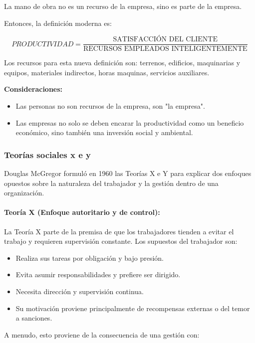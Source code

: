 \documentclass[a4paper,oneside,11pt]{article}
\begin{document}
La mano de obra no es un recurso de la empresa, sino es parte de la empresa.

Entonces, la definición moderna es:

\begin{equation}
    PRODUCTIVIDAD = \frac{\text{SATISFACCIÓN DEL CLIENTE}}{\text{RECURSOS EMPLEADOS INTELIGENTEMENTE}}
\end{equation}

Los recursos para esta nueva definición son: terrenos, edificios, maquinarias y equipos, materiales indirectos, horas maquinas, servicios auxiliares.

\textbf{Consideraciones:}
\begin{itemize}
    \item Las personas no son recursos de la empresa, son "la empresa".
    \item Las empresas no solo se deben encarar la productividad como un beneficio económico, sino también una inversión social y ambiental.
\end{itemize}

\subsubsection{Teorías sociales x e y}

Douglas McGregor formuló en 1960 las Teorías X e Y para explicar dos enfoques opuestos sobre la naturaleza del trabajador y la gestión dentro de una organización.


\paragraph{\textbf{Teoría X (Enfoque autoritario y de control):}}

La Teoría X parte de la premisa de que los trabajadores tienden a evitar el trabajo y requieren supervisión constante. Los supuestos del trabajador son:
\begin{itemize}
    \item Realiza sus tareas por obligación y bajo presión.
    \item Evita asumir responsabilidades y prefiere ser dirigido.
    \item Necesita dirección y supervisión continua.
    \item Su motivación proviene principalmente de recompensas externas o del temor a sanciones.
\end{itemize}

A menudo, esto proviene de la consecuencia de una gestión con:
\end{document}
